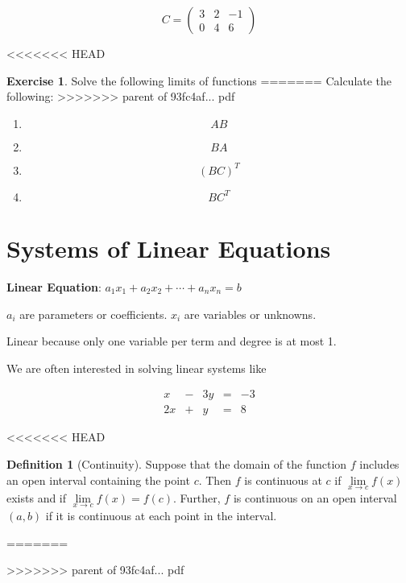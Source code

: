 \documentclass[]{book}
\providecommand{\tightlist}{%
  \setlength{\itemsep}{0pt}\setlength{\parskip}{0pt}}
\theoremstyle{definition}
\newtheorem{definition}{Definition}[chapter]
\theoremstyle{definition}
\theoremstyle{definition}
\newtheorem{exercise}{Exercise}[chapter]
\theoremstyle{remark}
\begin{document}
\[C =  \begin{pmatrix} 3&2&-1\\0&4&6 \end{pmatrix}\]

<<<<<<< HEAD
\begin{exercise}
\protect\hypertarget{exr:discontlim}{}{\label{exr:discontlim} }Solve the following limits of functions
=======
Calculate the following:
>>>>>>> parent of 93fc4af... pdf

\begin{enumerate}
\def\labelenumi{\arabic{enumi}.}
\tightlist
\item
  \[AB\]
\item
  \[BA\]
\item
  \[(BC)^T\]
\item
  \[BC^T\]
\end{enumerate}
\end{exercise}

\hypertarget{systems-of-linear-equations}{%
\section{Systems of Linear Equations}\label{systems-of-linear-equations}}

\textbf{Linear Equation}: \(a_1 x_1 + a_2 x_2 + \cdots + a_n x_n = b\)

\(a_i\) are parameters or coefficients. \(x_i\) are variables or unknowns.

Linear because only one variable per term and degree is at most 1.

We are often interested in solving linear systems like

\[\begin{matrix}
            x  & - & 3y & = & -3\\
            2x & + &  y & = &  8
            \end{matrix}\]

<<<<<<< HEAD
\begin{definition}[Continuity]
\protect\hypertarget{def:unnamed-chunk-7}{}{\label{def:unnamed-chunk-7} {} }Suppose that the domain of the function \(f\) includes an open interval containing the point \(c\). Then \(f\) is continuous at \(c\) if \(\lim\limits_{x \to c} f(x)\) exists and if \(\lim\limits_{x \to c} f(x)=f(c)\). Further, \(f\) is continuous on an open interval \((a,b)\) if it is continuous at each point in the interval.
\end{definition}
=======

>>>>>>> parent of 93fc4af... pdf
\end{document}
